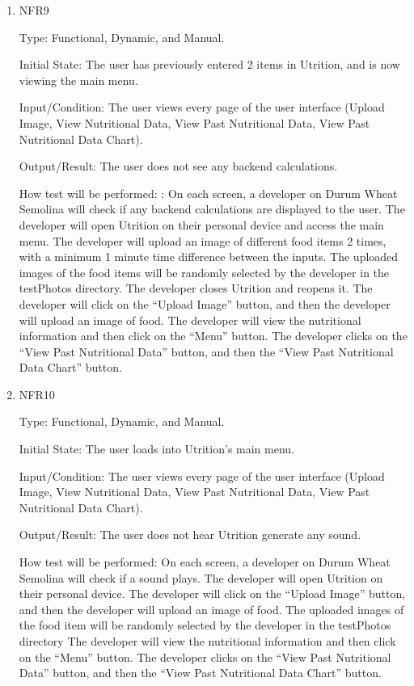 \documentclass[12pt, titlepage]{article}
\begin{document}
\begin{enumerate}
\item{NFR9\\}

Type: Functional, Dynamic, and Manual.

Initial State: The user has previously entered 2 items in Utrition, and is now viewing the main menu.

Input/Condition: The user views every page of the user interface (Upload Image, View Nutritional Data, View Past Nutritional Data, View Past Nutritional Data Chart).

Output/Result: The user does not see any backend calculations.

How test will be performed: : On each screen, a developer on Durum Wheat Semolina will check if any backend calculations are displayed to the user. The developer will open Utrition on their personal device and access the main menu. The developer will upload an image of different food items 2 times, with a minimum 1 minute time difference between the inputs. The uploaded images of the food items will be randomly selected by the developer in the testPhotos directory. The developer closes Utrition and reopens it. The developer will click on the “Upload Image” button, and then the developer will upload an image of food. The developer will view the nutritional information and then click on the “Menu” button. The developer clicks on the “View Past Nutritional Data'' button, and then the “View Past Nutritional Data Chart” button.

\item{NFR10\\}

Type: Functional, Dynamic, and Manual.

Initial State: The user loads into Utrition’s main menu.

Input/Condition: The user views every page of the user interface (Upload Image, View Nutritional Data, View Past Nutritional Data, View Past Nutritional Data Chart).

Output/Result: The user does not hear Utrition generate any sound.

How test will be performed: On each screen, a developer on Durum Wheat Semolina will check if a sound plays. The developer will open Utrition on their personal device. The developer will click on the “Upload Image” button, and then the developer will upload an image of food. The uploaded images of the food item will be randomly selected by the developer in the testPhotos directory The developer will view the nutritional information and then click on the “Menu” button. The developer clicks on the “View Past Nutritional Data” button, and then the “View Past Nutritional Data Chart” button.


\end{enumerate}
\end{document}
